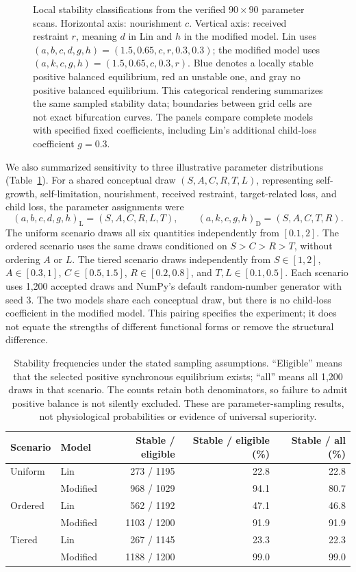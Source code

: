 \begin{figure}[tbp]
\centering
\PreliminaryMapFigure
\caption{Local stability classifications from the verified $90\times90$
parameter scans. Horizontal axis: nourishment $c$. Vertical axis: received
restraint $r$, meaning $d$ in Lin and $h$ in the modified model.
Lin uses $(a,b,c,d,g,h)=(1.5,0.65,c,r,0.3,0.3)$; the modified model uses
$(a,k,c,g,h)=(1.5,0.65,c,0.3,r)$. Blue denotes a locally stable positive
balanced equilibrium, red an unstable one, and gray no positive balanced
equilibrium. This categorical rendering summarizes the same sampled
stability data; boundaries between grid cells are not exact bifurcation
curves. The panels compare complete models with specified fixed
coefficients, including Lin's additional child-loss coefficient $g=0.3$.}
\label{fig:stability-maps}
\end{figure}

We also summarized sensitivity to three illustrative parameter distributions
(Table~\ref{tab:sampling}). For a shared conceptual draw
$(S,A,C,R,T,L)$, representing self-growth, self-limitation, nourishment,
received restraint, target-related loss, and child loss, the parameter
assignments were
\[
 (a,b,c,d,g,h)_{\mathrm L}=(S,A,C,R,L,T),\qquad
 (a,k,c,g,h)_{\mathrm D}=(S,A,C,T,R).
\]
The uniform scenario draws all six quantities independently from
$[0.1,2]$. The ordered scenario uses the same draws conditioned on
$S>C>R>T$, without ordering $A$ or $L$. The tiered scenario draws
independently from $S\in[1,2]$, $A\in[0.3,1]$, $C\in[0.5,1.5]$,
$R\in[0.2,0.8]$, and $T,L\in[0.1,0.5]$.
Each scenario uses 1,200 accepted draws and NumPy's default random-number
generator with seed 3. The two models share each conceptual draw, but
there is no child-loss coefficient in the modified model. This pairing
specifies the experiment; it does not equate the strengths of different
functional forms or remove the structural difference.

\begin{table}[tbp]
\centering
\small
\begin{tabular}{llrrr}
\toprule
Scenario & Model & Stable / eligible & Stable / eligible (\%) & Stable / all (\%)\\
\midrule
Uniform & Lin      & 273 / 1195  & 22.8 & 22.8\\
        & Modified & 968 / 1029  & 94.1 & 80.7\\
Ordered & Lin      & 562 / 1192  & 47.1 & 46.8\\
        & Modified & 1103 / 1200 & 91.9 & 91.9\\
Tiered  & Lin      & 267 / 1145  & 23.3 & 22.3\\
        & Modified & 1188 / 1200 & 99.0 & 99.0\\
\bottomrule
\end{tabular}
\caption{Stability frequencies under the stated sampling assumptions.
``Eligible'' means that the selected positive synchronous equilibrium
exists; ``all'' means all 1,200 draws in that scenario. The counts retain
both denominators, so failure to admit positive balance is not silently
excluded. These are parameter-sampling results, not physiological
probabilities or evidence of universal superiority.}
\label{tab:sampling}
\end{table}


